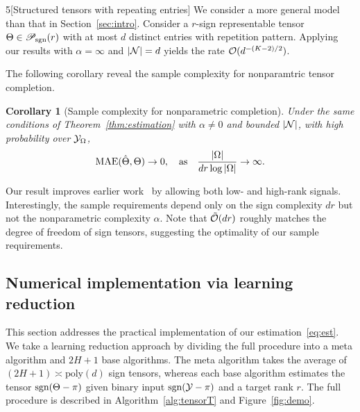 \documentclass{article}
\theoremstyle{plain}
\newtheorem{cor}{Corollary}
\theoremstyle{definition}
\def\sign{\textup{sgn}}
\def\caliP{\mathscr{P}_{\textup{sgn}}}
\begin{document}
\begin{customexample}{5}[Structured tensors with repeating entries]
We consider a more general model than that in Section~\ref{sec:intro}. Consider a $r$-sign representable tensor $\Theta\in \caliP(r)$ with at most $d$ distinct entries with repetition pattern. Applying our results with $\alpha=\infty$ and $|\mathcal{N}|=d$ yields the rate $\mathcal{O}(d^{-(K-2)/2})$. 
\end{customexample}

The following corollary reveal the sample complexity for nonparamtric tensor completion. 
\begin{cor}[Sample complexity for nonparametric completion] Under the same conditions of Theorem~\ref{thm:estimation} with $\alpha\neq 0$ and bounded $|\mathcal{N}|$, with high probability over $\mathcal{Y}_\Omega$, 
\[
\textup{MAE}(\hat \Theta, \Theta)\to 0, \quad \text{as}\quad {|\Omega|\over {dr} \log |\Omega|}\to \infty.
\]
\end{cor}
\vspace{-.2cm}
Our result improves earlier work~\citep{yuan2016tensor,ghadermarzy2019near,pmlr-v119-lee20i} by allowing both low- and high-rank signals. Interestingly, the sample requirements depend only on the sign complexity $dr$ but not the nonparametric complexity $\alpha$. Note that $\tilde {\mathcal{O}}(dr)$ roughly matches the degree of freedom of sign tensors, suggesting the optimality of our sample requirements. 


\subsection{Numerical implementation via learning reduction}
This section addresses the practical implementation of our estimation~\eqref{eq:est}. We take a learning reduction approach by dividing the full procedure into a meta algorithm and $2H+1$ base algorithms. The meta algorithm takes the average of $(2H+1)\asymp \text{poly}(d)$ sign tensors, whereas each base algorithm estimates the tensor $\sign(\Theta-\pi)$ given binary input $\sign(\tY-\pi)$ and a target rank $r$. The full procedure is described in Algorithm~\ref{alg:tensorT} and Figure~\ref{fig:demo}.
\end{document}
